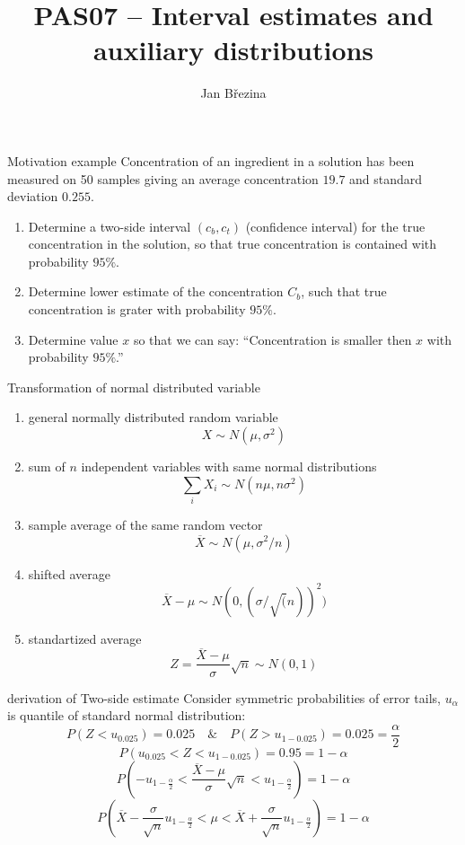 \documentclass[smaller]{beamer}
\title{PAS07 -- Interval estimates and auxiliary distributions}
\author{Jan B\v rezina}
\institute %
{
  Technical University of Liberec
}
\def\ol#1{\overline{#1}}
\begin{document}
\begin{frame}
  \titlepage
\end{frame}

\begin{frame}{Motivation example}
  Concentration of an ingredient in a solution has been measured on 50 samples giving an average concentration $19.7$
  and standard deviation $0.255$. 
  \begin{enumerate}
   \item  Determine a two-side interval $(c_b, c_t)$ (confidence interval) for the true concentration in the solution, so that 
          true concentration is contained with probability $95\%$.
   \item  Determine lower estimate of the concentration $C_b$, such that true concentration is grater with probability  $95\%$.
   \item  Determine value $x$ so that we can say: ``Concentration is smaller then $x$ with probability $95\%$.''
   \end{enumerate}
\end{frame}

\begin{frame}{Transformation of normal distributed variable}
\begin{enumerate}
 \item general normally distributed random variable 
  \[ X \sim N(\mu, \sigma^2)\]
 \item sum of $n$ independent variables with same normal distributions
  \[ \sum_i X_i \sim N(n \mu, n \sigma^2)\]

 \item sample average of the same random vector
  \[ \ol{X} \sim N(\mu, \sigma^2 / n)\]
 \item shifted average
  \[ \ol{X} - \mu \sim N(0, ( \sigma / \sqrt(n) ) ^2 )\] 
 \item standartized average
  \[ Z=\frac{\ol{X} - \mu}{\sigma} \sqrt{n} \sim N(0, 1)\]
\end{enumerate}

\end{frame}

\begin{frame}{derivation of Two-side estimate}
Consider symmetric probabilities of error tails, $u_\alpha$ is quantile of standard normal distribution:
\[
  P( Z < u_{0.025}) = 0.025 \quad \& \quad P( Z > u_{1-0.025}) = 0.025 = \frac{\alpha}{2}
\]
\[
 P( u_{0.025} < Z < u_{1- 0.025} ) = 0.95 = 1-\alpha
\]
\[
 P( -u_{1-\frac{\alpha}{2}} < \frac{\ol{X} - \mu}{\sigma}\sqrt{n} < u_{1-\frac{\alpha}{2}} ) = 1-\alpha
\]
\[
 P( \ol{X} - \frac{\sigma }{\sqrt{n}}u_{1-\frac{\alpha}{2}} < \mu < \ol{X} + \frac{\sigma }{\sqrt{n}}u_{1-\frac{\alpha}{2}} ) = 1-\alpha
\]
\end{frame}
\end{document}
